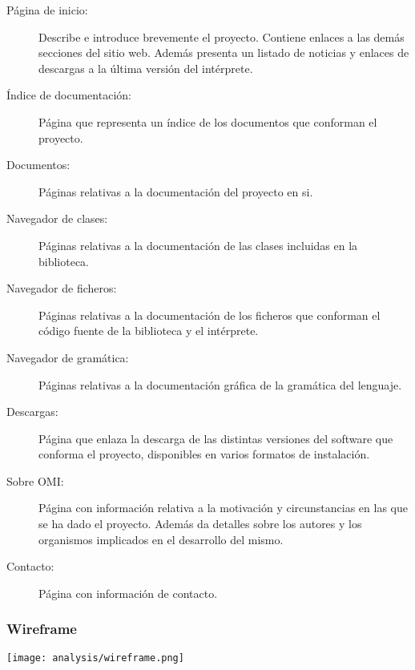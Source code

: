 \begin{description}
\item [Página de inicio:] Describe e introduce brevemente el proyecto. Contiene enlaces a las demás secciones del sitio web. Además presenta un
listado de noticias y enlaces de descargas a la última versión del intérprete.
\item [Índice de documentación:] Página que representa un índice de los documentos que conforman el proyecto.
\item [Documentos:] Páginas relativas a la documentación del proyecto en si.
\item [Navegador de clases:] Páginas relativas a la documentación de las clases incluidas en la biblioteca. 
\item [Navegador de ficheros:] Páginas relativas a la documentación de los ficheros que conforman 
el código fuente de la biblioteca y el intérprete.
\item [Navegador de gramática:] Páginas relativas a la documentación gráfica de la gramática del lenguaje.
\item [Descargas:] Página que enlaza la descarga de las distintas versiones del software que conforma el proyecto, disponibles en varios formatos de instalación.
\item [Sobre OMI:] Página con información relativa a la motivación y circunstancias en las que se ha dado el proyecto. Además da detalles sobre los autores y los
organismos implicados en el desarrollo del mismo.
\item [Contacto:] Página con información de contacto.
\end{description}
\pagebreak
\subsubsection{Wireframe}
\begin{center}
\texttt{[image: analysis/wireframe.png]}
\end{center}

